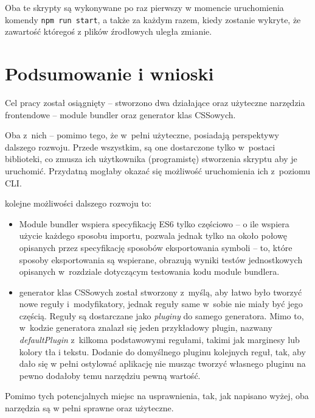 \documentclass{SGGW-thesis}
\begin{document}
Oba te skrypty są wykonywane po raz pierwszy w momencie uruchomienia komendy \verb|npm run start|, a także za każdym razem, kiedy zostanie wykryte, że zawartość któregoś z plików źrodłowych uległa zmianie.

\chapter{Podsumowanie i wnioski}
Cel pracy został osiągnięty -- stworzono dwa działające oraz użyteczne narzędzia frontendowe -- module bundler oraz generator klas CSSowych.

Oba z~nich -- pomimo tego, że w~pełni użyteczne, posiadają perspektywy dalszego rozwoju.
Przede wszystkim, są one dostarczone tylko w~postaci biblioteki, co zmusza ich użytkownika (programistę) stworzenia skryptu aby je uruchomić. Przydatną mogłaby okazać się możliwość uruchomienia ich z~poziomu CLI.

kolejne możliwości dalszego rozwoju to:
\begin{itemize}
    \item Module bundler wspiera specyfikację ES6 tylko częściowo -- o ile wspiera użycie każdego sposobu importu, pozwala jednak tylko na około połowę opisanych przez specyfikację sposobów eksportowania symboli -- to, które sposoby eksportowania są wspierane, obrazują wyniki testów jednostkowych opisanych w~rozdziale dotyczącym testowania kodu module bundlera.
    \item generator klas CSSowych został stworzony z~myślą, aby łatwo było tworzyć nowe reguły i~modyfikatory, jednak reguły same w~sobie nie miały być jego częścią. Reguły są dostarczane jako \emph{pluginy} do samego generatora. Mimo to, w~kodzie generatora znalazł się jeden przykładowy plugin, nazwany \emph{defaultPlugin} z~kilkoma podstawowymi regułami, takimi jak marginesy lub kolory tła i tekstu. Dodanie do domyślnego pluginu kolejnych reguł, tak, aby dało się w pełni ostylować aplikację nie musząc tworzyć własnego pluginu na pewno dodałoby temu narzędziu pewną wartość.
\end{itemize}

Pomimo tych potencjalnych miejsc na usprawnienia, tak, jak napisano wyżej, oba narzędzia są w pełni sprawne oraz użyteczne.
\end{document}
